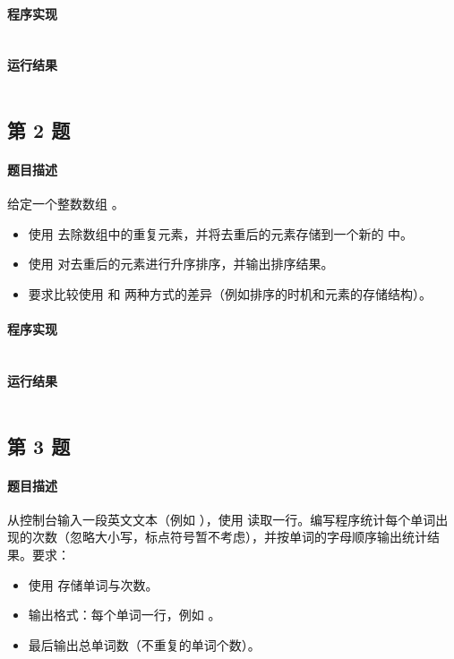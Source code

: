 \documentclass{academics}
\begin{document}
\paragraph{程序实现} {
    \inputminted[label=ListAnalyzer.java]{java}{../src/P01/ListAnalyzer.java}
}

\paragraph{运行结果} {
    \inputminted{text}{../res/P01.out}
}

\subsection{第 2 题}

\paragraph{题目描述} {
    给定一个整数数组 。
    \begin{itemize}
        \item 使用  去除数组中的重复元素，并将去重后的元素存储到一个新的  中。
        \item 使用  对去重后的元素进行升序排序，并输出排序结果。
        \item 要求比较使用  和  两种方式的差异（例如排序的时机和元素的存储结构）。
    \end{itemize}
}

\paragraph{程序实现} {
    \inputminted[label=HashSetSort.java]{java}{../src/P02/HashSetSort.java}
}

\paragraph{运行结果} {
    \inputminted{text}{../res/P02.out}
}

\subsection{第 3 题}

\paragraph{题目描述} {
    从控制台输入一段英文文本（例如 ），使用  读取一行。编写程序统计每个单词出现的次数（忽略大小写，标点符号暂不考虑），并按单词的字母顺序输出统计结果。要求：
    \begin{itemize}
        \item 使用  存储单词与次数。
        \item 输出格式：每个单词一行，例如 。
        \item 最后输出总单词数（不重复的单词个数）。
    \end{itemize}
}
\end{document}
